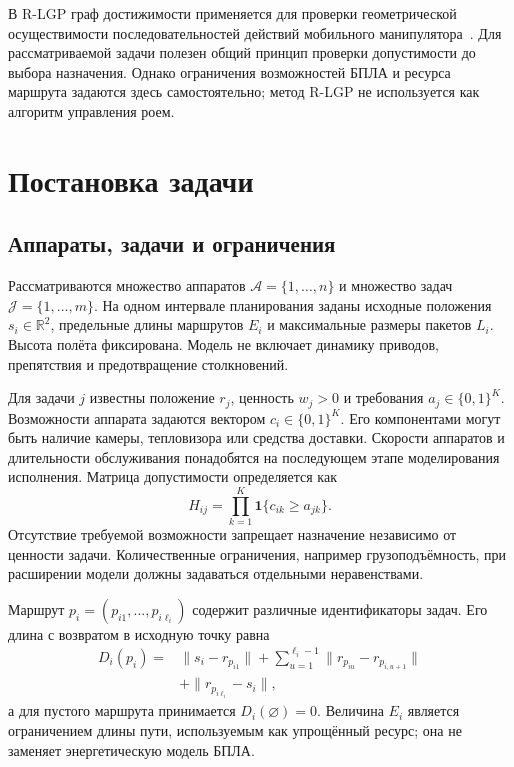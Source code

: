 \documentclass{misisarticle}
\begin{document}
В R-LGP граф достижимости применяется для проверки геометрической осуществимости последовательностей действий мобильного манипулятора~\cite{ly2024}. Для рассматриваемой задачи полезен общий принцип проверки допустимости до выбора назначения. Однако ограничения возможностей БПЛА и ресурса маршрута задаются здесь самостоятельно; метод R-LGP не используется как алгоритм управления роем.

\section{Постановка задачи}

\subsection{Аппараты, задачи и ограничения}

Рассматриваются множество аппаратов $\mathcal A=\{1,\ldots,n\}$ и множество задач $\mathcal J=\{1,\ldots,m\}$. На одном интервале планирования заданы исходные положения $s_i\in\mathbb R^2$, предельные длины маршрутов $E_i$ и максимальные размеры пакетов $L_i$. Высота полёта фиксирована. Модель не включает динамику приводов, препятствия и предотвращение столкновений.

Для задачи $j$ известны положение $r_j$, ценность $w_j>0$ и требования $a_j\in\{0,1\}^{K}$. Возможности аппарата задаются вектором $c_i\in\{0,1\}^{K}$. Его компонентами могут быть наличие камеры, тепловизора или средства доставки. Скорости аппаратов и длительности обслуживания понадобятся на последующем этапе моделирования исполнения. Матрица допустимости определяется как
\begin{equation}
 H_{ij}=\prod_{k=1}^{K}\mathbf 1\{c_{ik}\geq a_{jk}\}.
\end{equation}
Отсутствие требуемой возможности запрещает назначение независимо от ценности задачи. Количественные ограничения, например грузоподъёмность, при расширении модели должны задаваться отдельными неравенствами.

Маршрут $p_i=(p_{i1},\ldots,p_{i\ell_i})$ содержит различные идентификаторы задач. Его длина с возвратом в исходную точку равна
\begin{equation}
\begin{aligned}
 D_i(p_i)={}&\|s_i-r_{p_{i1}}\|
 +\sum_{u=1}^{\ell_i-1}\|r_{p_{iu}}-r_{p_{i,u+1}}\|\\
 &+\|r_{p_{i\ell_i}}-s_i\|,
\end{aligned}
\end{equation}
а для пустого маршрута принимается $D_i(\varnothing)=0$. Величина $E_i$ является ограничением длины пути, используемым как упрощённый ресурс; она не заменяет энергетическую модель БПЛА.
\end{document}
